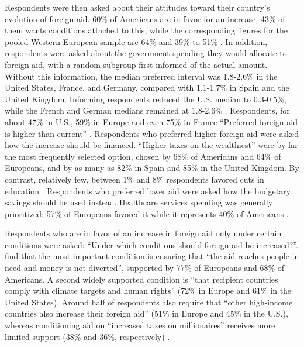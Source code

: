 \documentclass[11pt,a4paper]{article}
\begin{document}
Respondents were then asked about their attitudes toward their country's evolution of foreign aid. 60\% of Americans are in favor for an increase, 43\% of them wants conditions attached to this, while the corresponding figures for the pooled Western European sample are 64\% and 39\% to 51\% \citep[Figure 6]{fabre_majority_2025_si}. In addition, respondents were asked about the government spending they would allocate to foreign aid, with a random subgroup first informed of the actual amount. Without this information, the median preferred interval was 1.8-2.6\% in the United States, France, and Germany, compared with 1.1-1.7\% in Spain and the United Kingdom. Informing respondents reduced the U.S. median to 0.3-0.5\%, while the French and German medians remained at 1.8-2.6\% \citep[Figure S20-S21]{fabre_majority_2025_si}. Respondents, for about 47\% in U.S., 59\% in Europe and even 75\% in France ``Preferred foreign aid is higher than current'' \citep[Figure S23]{fabre_majority_2025_si}. Respondents who preferred higher foreign aid were asked how the increase should be financed. ``Higher taxes on the wealthiest'' were by far the most frequently selected option, chosen by 68\% of Americans and 64\% of Europeans, and by as many as 82\% in Spain and 85\% in the United Kingdom. By contrast, relatively few, between 1\% and 8\% respondents favored cuts in education \citep[Figure S24]{fabre_majority_2025_si}. Respondents who preferred lower aid were asked how the budgetary savings should be used instead. Healthcare services spending was generally prioritized: 57\% of Europeans favored it while it represents 40\% of Americans \citep[Figure S25]{fabre_majority_2025_si}.

Respondents who are in favor of an increase in foreign aid only under certain conditions were asked: ``Under which conditions should foreign aid be increased?''. \citet{fabre_majority_2025} find that the most important condition is ensuring that ``the aid reaches people in need and money is not diverted'', supported by 77\% of Europeans and 68\% of Americans. A second widely supported condition is ``that recipient countries comply with climate targets and human rights'' (72\% in Europe and 61\% in the United States). Around half of respondents also require that ``other high-income countries also increase their foreign aid'' (51\% in Europe and 45\% in the U.S.), whereas conditioning aid on ``increased taxes on millionaires'' receives more limited support (38\% and 36\%, respectively) \citep[Figure 7]{fabre_majority_2025}.
\end{document}

